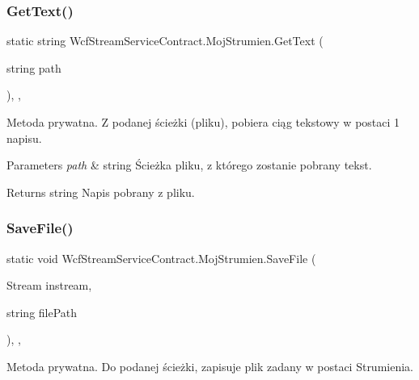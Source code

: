 \subsubsection{\texorpdfstring{Get\+Text()}{GetText()}}
{\footnotesize\ttfamily static string Wcf\+Stream\+Service\+Contract.\+Moj\+Strumien.\+Get\+Text (\begin{DoxyParamCaption}\item[{string}]{path }\end{DoxyParamCaption})\hspace{0.3cm}{\ttfamily [inline]}, {\ttfamily [static]}, {\ttfamily [private]}}



Metoda prywatna. Z podanej ścieżki (pliku), pobiera ciąg tekstowy w postaci 1 napisu. 


\begin{DoxyParams}{Parameters}
{\em path} & string Ścieżka pliku, z którego zostanie pobrany tekst.\\
\hline
\end{DoxyParams}
\begin{DoxyReturn}{Returns}
string Napis pobrany z pliku.
\end{DoxyReturn}
\mbox{\label{class_wcf_stream_service_contract_1_1_moj_strumien_a564bd50d25c5facb1ce1d5eacd966881}} 
\subsubsection{\texorpdfstring{Save\+File()}{SaveFile()}}
{\footnotesize\ttfamily static void Wcf\+Stream\+Service\+Contract.\+Moj\+Strumien.\+Save\+File (\begin{DoxyParamCaption}\item[{Stream}]{instream,  }\item[{string}]{file\+Path }\end{DoxyParamCaption})\hspace{0.3cm}{\ttfamily [inline]}, {\ttfamily [static]}, {\ttfamily [private]}}



Metoda prywatna. Do podanej ścieżki, zapisuje plik zadany w postaci Strumienia. 


